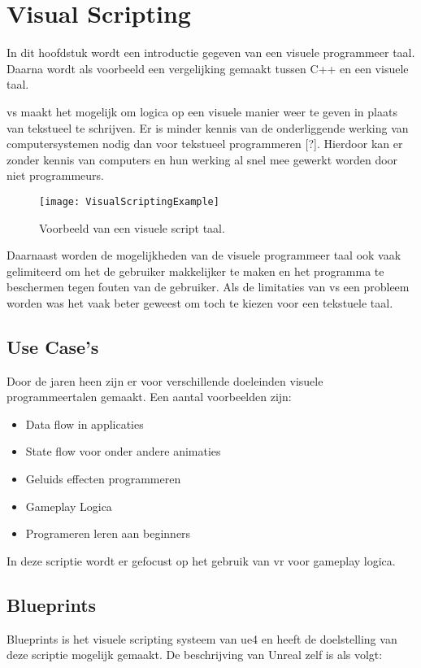 \lstset {language=C++}

\chapter{Visual Scripting}
\label{ch:visualscripting}
In dit hoofdstuk wordt een introductie gegeven van een visuele programmeer taal. Daarna wordt als voorbeeld een vergelijking gemaakt tussen C++ en een visuele taal.

\gls{vs} maakt het mogelijk om logica op een visuele manier weer te geven in plaats van tekstueel te schrijven. Er is minder kennis van de onderliggende werking van computersystemen nodig dan voor tekstueel programmeren [?]. Hierdoor kan er zonder kennis van computers en hun werking al snel mee gewerkt worden door niet programmeurs. 

\begin{figure}[!ht]
  \centering
    \texttt{[image: VisualScriptingExample]}
    \caption{Voorbeeld van een visuele script taal.}
\end{figure}

Daarnaast worden de mogelijkheden van de visuele programmeer taal ook vaak gelimiteerd om het de gebruiker makkelijker te maken en het programma te beschermen tegen fouten van de gebruiker. Als de limitaties van \gls{vs} een probleem worden was het vaak beter geweest om toch te kiezen voor een tekstuele taal.

\section{Use Case's}
Door de jaren heen zijn er voor verschillende doeleinden visuele programmeertalen gemaakt. 
Een aantal voorbeelden zijn:

\begin{itemize}  
\item Data flow in applicaties 
\item State flow voor onder andere animaties 
\item Geluids effecten programmeren
\item Gameplay Logica 
\item Programeren leren aan beginners 
\end{itemize}

In deze scriptie wordt er gefocust op het gebruik van \gls{vr} voor gameplay logica.

\section{Blueprints}
Blueprints is het visuele scripting systeem van \gls{ue4} en heeft de doelstelling van deze scriptie mogelijk gemaakt. De beschrijving van Unreal zelf is als volgt:

